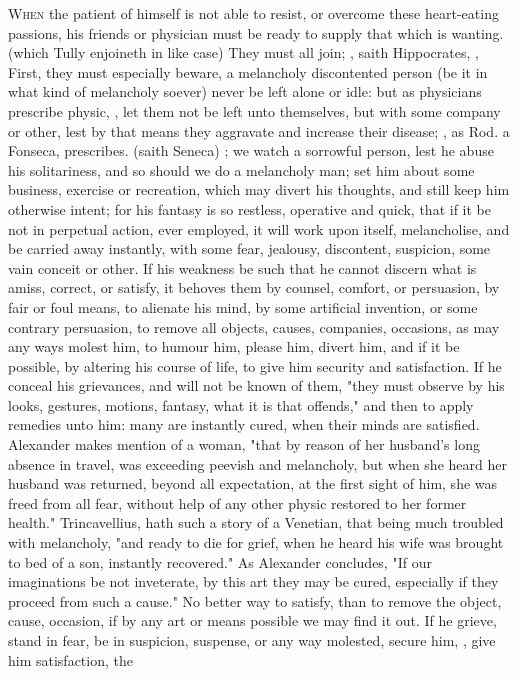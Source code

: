 {\lettrine{W}{hen} the patient of himself is not able to resist, or overcome these heart-eating passions, his friends or physician must be ready to supply that which is wanting.  (which Tully enjoineth in like case)  They must all join; , saith Hippocrates, , \etc{} First, they must especially beware, a melancholy discontented person (be it in what kind of melancholy soever) never be left alone or idle: but as physicians prescribe physic, , let them not be left unto themselves, but with some company or other, lest by that means they aggravate and increase their disease; , as Rod. a Fonseca,  prescribes.  (saith Seneca) ; we watch a sorrowful person, lest he abuse his solitariness, and so should we do a melancholy man; set him about some business, exercise or recreation, which may divert his thoughts, and still keep him otherwise intent; for his fantasy is so restless, operative and quick, that if it be not in perpetual action, ever employed, it will work upon itself, melancholise, and be carried away instantly, with some fear, jealousy, discontent, suspicion, some vain conceit or other. If his weakness be such that he cannot discern what is amiss, correct, or satisfy, it behoves them by counsel, comfort, or persuasion, by fair or foul means, to alienate his mind, by some artificial invention, or some contrary persuasion, to remove all objects, causes, companies, occasions, as may any ways molest him, to humour him, please him, divert him, and if it be possible, by altering his course of life, to give him security and satisfaction. If he conceal his grievances, and will not be known of them, "they must observe by his looks, gestures, motions, fantasy, what it is that offends," and then to apply remedies unto him: many are instantly cured, when their minds are satisfied. Alexander makes mention of a woman, "that by reason of her husband's long absence in travel, was exceeding peevish and melancholy, but when she heard her husband was returned, beyond all expectation, at the first sight of him, she was freed from all fear, without help of any other physic restored to her former health." Trincavellius,  hath such a story of a Venetian, that being much troubled with melancholy, "and ready to die for grief, when he heard his wife was brought to bed of a son, instantly recovered." As Alexander concludes, "If our imaginations be not inveterate, by this art they may be cured, especially if they proceed from such a cause." No better way to satisfy, than to remove the object, cause, occasion, if by any art or means possible we may find it out. If he grieve, stand in fear, be in suspicion, suspense, or any way molested, secure him, , give him satisfaction, the }
